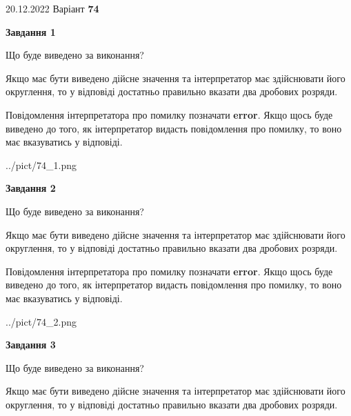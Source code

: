 \documentclass[12pt, ukrainian]{article}
\begin{document}
{20.12.2022 Варіант \No \textbf { 74 }\par}
{
\begin {Large}

{\begin {center}\textbf{Завдання 1}\end {center}}\par
Що буде виведено за виконання? \par

Якщо має бути виведено дійсне значення та інтерпретатор має здійснювати його округлення, 
то у відповіді достатньо правильно вказати два дробових розряди.

Повідомлення інтерпретатора про помилку позначати \textbf{error}.
Якщо щось буде виведено до того, як інтерпретатор видасть повідомлення про помилку, 
то воно має вказуватись у відповіді. \par

\begin{center}
	{../pict/74_1.png}
\end{center}
\newpage

{\begin {center}\textbf{Завдання 2}\end {center}}\par
Що буде виведено за виконання? \par

Якщо має бути виведено дійсне значення та інтерпретатор має здійснювати його округлення, 
то у відповіді достатньо правильно вказати два дробових розряди.

Повідомлення інтерпретатора про помилку позначати \textbf{error}.
Якщо щось буде виведено до того, як інтерпретатор видасть повідомлення про помилку, 
то воно має вказуватись у відповіді. \par

\begin{center}
	{../pict/74_2.png}
\end{center}
\newpage

{\begin {center}\textbf{Завдання 3}\end {center}}\par
Що буде виведено за виконання? \par

Якщо має бути виведено дійсне значення та інтерпретатор має здійснювати його округлення, 
то у відповіді достатньо правильно вказати два дробових розряди.


\end{Large}}
\end{document}

